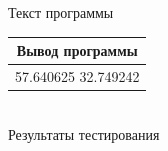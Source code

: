 \documentclass[a4paper,14pt]{extarticle}
\begin{document}

\begin{center}
Текст программы\\
\vspace{0.6cm}
\begin{tabular}{|l|}
\hline
\multicolumn{1}{|c|}{Вывод программы}\\
\hline
57.640625 32.749242 \\
\hline
\end{tabular}\\
\vspace{0.3cm}
Результаты тестирования
\end{center}
\end{document}
